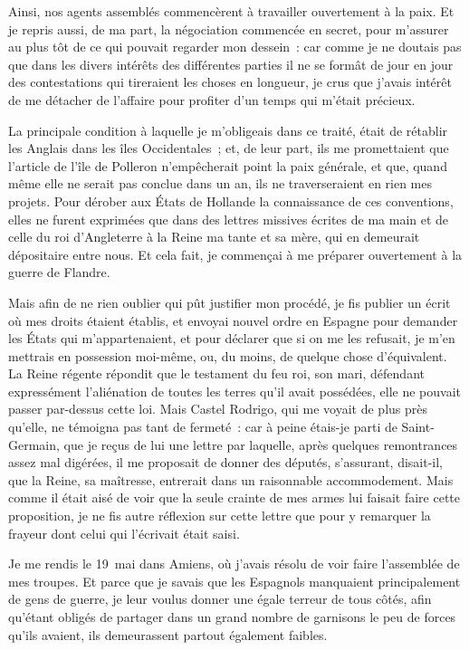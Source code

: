 \documentclass[french,twoside]{book} %
\begin{document}
Ainsi, nos agents assemblés commencèrent à travailler ouvertement à la paix. Et je repris aussi, de ma part, la négociation commencée en secret, pour m’assurer au plus tôt de ce qui pouvait regarder mon dessein : car comme je ne doutais pas que dans les divers intérêts des différentes parties il ne se formât de jour en jour des contestations qui tireraient les choses en longueur, je crus que j’avais intérêt de me détacher de l’affaire pour profiter d’un temps qui m’était précieux.\par
La principale condition à laquelle je m’obligeais dans ce traité, était de rétablir les Anglais dans les îles Occidentales ; et, de leur part, ils me promettaient que l’article de l’île de Polleron n’empêcherait point la paix générale, et que, quand même elle ne serait pas conclue dans un an, ils ne traverseraient en rien mes projets. Pour dérober aux États de Hollande la connaissance de ces conventions, elles ne furent exprimées que dans des lettres missives écrites de ma main et de celle du roi d’Angleterre à la Reine ma tante et sa mère, qui en demeurait dépositaire entre nous. Et cela fait, je commençai à me préparer ouvertement à la guerre de Flandre.\par
Mais afin de ne rien oublier qui pût justifier mon procédé, je fis publier un écrit où mes droits étaient établis, et envoyai nouvel ordre en Espagne pour demander les États qui m’appartenaient, et pour déclarer que si on me les refusait, je m’en mettrais en possession moi-même, ou, du moins, de quelque chose d’équivalent. La Reine régente répondit que le testament du feu roi, son mari, défendant expressément l’aliénation de toutes les terres qu’il avait possédées, elle ne pouvait passer par-dessus cette loi. Mais Castel Rodrigo, qui me voyait de plus près qu’elle, ne témoigna pas tant de fermeté : car à peine étais-je parti de Saint-Germain, que je reçus de lui une lettre par laquelle, après quelques remontrances assez mal digérées, il me proposait de donner des députés, s’assurant, disait-il, que la Reine, sa maîtresse, entrerait dans un raisonnable accommodement. Mais comme il était aisé de voir que la seule crainte de mes armes lui faisait faire cette proposition, je ne fis autre réflexion sur cette lettre que pour y remarquer la frayeur dont celui qui l’écrivait était saisi.\par
Je me rendis le 19 mai dans Amiens, où j’avais résolu de voir faire l’assemblée de mes troupes. Et parce que je savais que les Espagnols manquaient principalement de gens de guerre, je leur voulus donner une égale terreur de tous côtés, afin qu’étant obligés de partager dans un grand nombre de garnisons le peu de forces qu’ils avaient, ils demeurassent partout également faibles.\par
\end{document}
